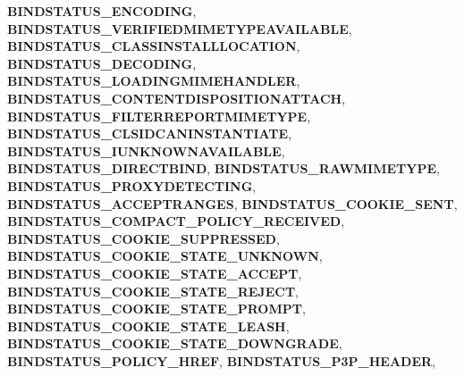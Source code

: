 \begin{DoxyCompactItemize}
\newline
{\bfseries B\+I\+N\+D\+S\+T\+A\+T\+U\+S\+\_\+\+E\+N\+C\+O\+D\+I\+NG}, 
{\bfseries B\+I\+N\+D\+S\+T\+A\+T\+U\+S\+\_\+\+V\+E\+R\+I\+F\+I\+E\+D\+M\+I\+M\+E\+T\+Y\+P\+E\+A\+V\+A\+I\+L\+A\+B\+LE}, 
{\bfseries B\+I\+N\+D\+S\+T\+A\+T\+U\+S\+\_\+\+C\+L\+A\+S\+S\+I\+N\+S\+T\+A\+L\+L\+L\+O\+C\+A\+T\+I\+ON}, 
{\bfseries B\+I\+N\+D\+S\+T\+A\+T\+U\+S\+\_\+\+D\+E\+C\+O\+D\+I\+NG}, 
\newline
{\bfseries B\+I\+N\+D\+S\+T\+A\+T\+U\+S\+\_\+\+L\+O\+A\+D\+I\+N\+G\+M\+I\+M\+E\+H\+A\+N\+D\+L\+ER}, 
{\bfseries B\+I\+N\+D\+S\+T\+A\+T\+U\+S\+\_\+\+C\+O\+N\+T\+E\+N\+T\+D\+I\+S\+P\+O\+S\+I\+T\+I\+O\+N\+A\+T\+T\+A\+CH}, 
{\bfseries B\+I\+N\+D\+S\+T\+A\+T\+U\+S\+\_\+\+F\+I\+L\+T\+E\+R\+R\+E\+P\+O\+R\+T\+M\+I\+M\+E\+T\+Y\+PE}, 
{\bfseries B\+I\+N\+D\+S\+T\+A\+T\+U\+S\+\_\+\+C\+L\+S\+I\+D\+C\+A\+N\+I\+N\+S\+T\+A\+N\+T\+I\+A\+TE}, 
\newline
{\bfseries B\+I\+N\+D\+S\+T\+A\+T\+U\+S\+\_\+\+I\+U\+N\+K\+N\+O\+W\+N\+A\+V\+A\+I\+L\+A\+B\+LE}, 
{\bfseries B\+I\+N\+D\+S\+T\+A\+T\+U\+S\+\_\+\+D\+I\+R\+E\+C\+T\+B\+I\+ND}, 
{\bfseries B\+I\+N\+D\+S\+T\+A\+T\+U\+S\+\_\+\+R\+A\+W\+M\+I\+M\+E\+T\+Y\+PE}, 
{\bfseries B\+I\+N\+D\+S\+T\+A\+T\+U\+S\+\_\+\+P\+R\+O\+X\+Y\+D\+E\+T\+E\+C\+T\+I\+NG}, 
\newline
{\bfseries B\+I\+N\+D\+S\+T\+A\+T\+U\+S\+\_\+\+A\+C\+C\+E\+P\+T\+R\+A\+N\+G\+ES}, 
{\bfseries B\+I\+N\+D\+S\+T\+A\+T\+U\+S\+\_\+\+C\+O\+O\+K\+I\+E\+\_\+\+S\+E\+NT}, 
{\bfseries B\+I\+N\+D\+S\+T\+A\+T\+U\+S\+\_\+\+C\+O\+M\+P\+A\+C\+T\+\_\+\+P\+O\+L\+I\+C\+Y\+\_\+\+R\+E\+C\+E\+I\+V\+ED}, 
{\bfseries B\+I\+N\+D\+S\+T\+A\+T\+U\+S\+\_\+\+C\+O\+O\+K\+I\+E\+\_\+\+S\+U\+P\+P\+R\+E\+S\+S\+ED}, 
\newline
{\bfseries B\+I\+N\+D\+S\+T\+A\+T\+U\+S\+\_\+\+C\+O\+O\+K\+I\+E\+\_\+\+S\+T\+A\+T\+E\+\_\+\+U\+N\+K\+N\+O\+WN}, 
{\bfseries B\+I\+N\+D\+S\+T\+A\+T\+U\+S\+\_\+\+C\+O\+O\+K\+I\+E\+\_\+\+S\+T\+A\+T\+E\+\_\+\+A\+C\+C\+E\+PT}, 
{\bfseries B\+I\+N\+D\+S\+T\+A\+T\+U\+S\+\_\+\+C\+O\+O\+K\+I\+E\+\_\+\+S\+T\+A\+T\+E\+\_\+\+R\+E\+J\+E\+CT}, 
{\bfseries B\+I\+N\+D\+S\+T\+A\+T\+U\+S\+\_\+\+C\+O\+O\+K\+I\+E\+\_\+\+S\+T\+A\+T\+E\+\_\+\+P\+R\+O\+M\+PT}, 
\newline
{\bfseries B\+I\+N\+D\+S\+T\+A\+T\+U\+S\+\_\+\+C\+O\+O\+K\+I\+E\+\_\+\+S\+T\+A\+T\+E\+\_\+\+L\+E\+A\+SH}, 
{\bfseries B\+I\+N\+D\+S\+T\+A\+T\+U\+S\+\_\+\+C\+O\+O\+K\+I\+E\+\_\+\+S\+T\+A\+T\+E\+\_\+\+D\+O\+W\+N\+G\+R\+A\+DE}, 
{\bfseries B\+I\+N\+D\+S\+T\+A\+T\+U\+S\+\_\+\+P\+O\+L\+I\+C\+Y\+\_\+\+H\+R\+EF}, 
{\bfseries B\+I\+N\+D\+S\+T\+A\+T\+U\+S\+\_\+\+P3\+P\+\_\+\+H\+E\+A\+D\+ER}, 

\end{DoxyCompactItemize}
